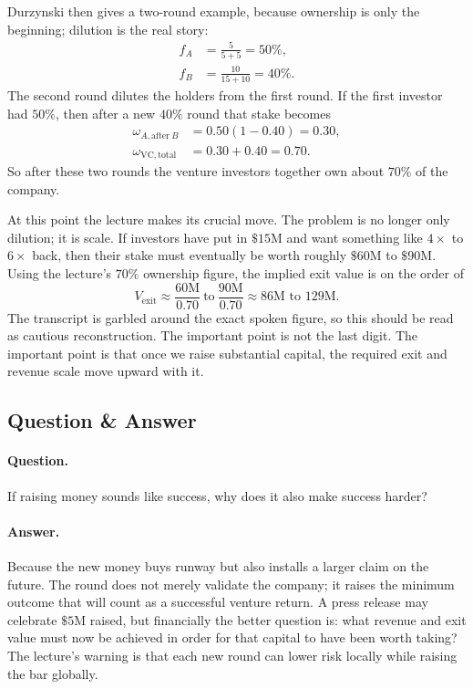 Durzynski then gives a two-round example, because ownership is only the beginning; dilution is the real story:
\begin{align}
f_A &= \frac{5}{5+5} = 50\%, \\
f_B &= \frac{10}{15+10} = 40\%.
\end{align}
The second round dilutes the holders from the first round. If the first investor had \(50\%\), then after a new \(40\%\) round that stake becomes
\begin{align}
\omega_{A,\mathrm{after}\ B} &= 0.50(1-0.40)=0.30, \\
\omega_{\mathrm{VC,total}} &= 0.30 + 0.40 = 0.70.
\end{align}
So after these two rounds the venture investors together own about \(70\%\) of the company.

At this point the lecture makes its crucial move. The problem is no longer only dilution; it is scale. If investors have put in \(\$15\text{M}\) and want something like \(4\times\) to \(6\times\) back, then their stake must eventually be worth roughly \(\$60\text{M}\) to \(\$90\text{M}\). Using the lecture's \(70\%\) ownership figure, the implied exit value is on the order of
\begin{equation}
V_{\mathrm{exit}} \approx \frac{60\text{M}}{0.70}\ \text{to}\ \frac{90\text{M}}{0.70}
\approx 86\text{M to }129\text{M}.
\end{equation}
The transcript is garbled around the exact spoken figure, so this should be read as cautious reconstruction. The important point is not the last digit. The important point is that once we raise substantial capital, the required exit and revenue scale move upward with it.

\subsection{Question \& Answer}

\paragraph{Question.}
If raising money sounds like success, why does it also make success harder?

\paragraph{Answer.}
Because the new money buys runway but also installs a larger claim on the future. The round does not merely validate the company; it raises the minimum outcome that will count as a successful venture return. A press release may celebrate \(\$5\text{M}\) raised, but financially the better question is: what revenue and exit value must now be achieved in order for that capital to have been worth taking? The lecture's warning is that each new round can lower risk locally while raising the bar globally.

